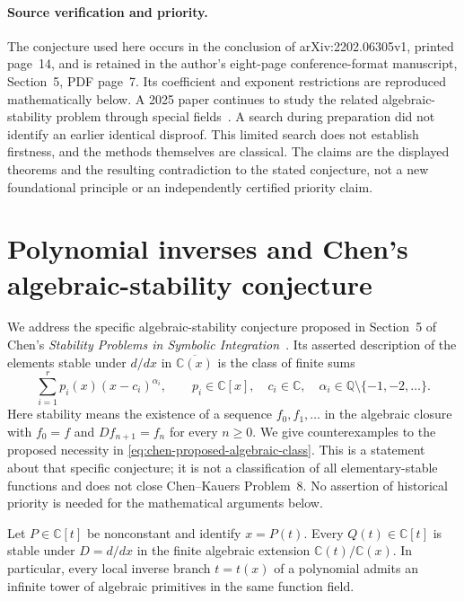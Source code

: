 \paragraph{Source verification and priority.}
The conjecture used here occurs in the conclusion of arXiv:2202.06305v1,
printed page~14, and is retained in the author's eight-page
conference-format manuscript, Section~5, PDF page~7. Its coefficient
and exponent restrictions are reproduced mathematically below.
A 2025 paper continues to study the related algebraic-stability problem
through special fields~\cite[Proposition~5.3]{SSS2025}. A search during
preparation did not identify an earlier identical disproof. This limited
search does not establish firstness, and the methods themselves are
classical. The claims are the displayed theorems and the resulting
contradiction to the stated conjecture, not a new foundational principle
or an independently certified priority claim.
\section{Polynomial inverses and Chen's algebraic-stability conjecture}
\label{sec:polynomial-inverses}

We address the specific algebraic-stability conjecture proposed in Section~5
of Chen's \emph{Stability Problems in Symbolic Integration}~\cite{Chen2022}. Its asserted
description of the elements stable under $d/dx$ in
$\overline{\mathbb C(x)}$ is the class of finite sums
\begin{equation}\label{eq:chen-proposed-algebraic-class}
 \sum_{i=1}^{r}p_i(x)(x-c_i)^{\alpha_i},\qquad
 p_i\in\mathbb C[x],\quad c_i\in\mathbb C,\quad
 \alpha_i\in\mathbb Q\setminus\{-1,-2,\ldots\}.
\end{equation}
Here stability means the existence of a sequence $f_0,f_1,\ldots$ in the
algebraic closure with $f_0=f$ and $Df_{n+1}=f_n$ for every $n\ge0$.
We give counterexamples to the proposed necessity in
\eqref{eq:chen-proposed-algebraic-class}. This is a statement about that
specific conjecture; it is not a classification of all elementary-stable
functions and does not close Chen--Kauers Problem~8. No assertion of historical
priority is needed for the mathematical arguments below.

\begin{proposition}
\label{prop:polynomial-pullback}
Let $P\in\mathbb C[t]$ be nonconstant and identify $x=P(t)$. Every
$Q(t)\in\mathbb C[t]$ is stable under $D=d/dx$ in the finite algebraic
extension $\mathbb C(t)/\mathbb C(x)$. In particular, every local inverse
branch $t=t(x)$ of a polynomial admits an infinite tower of algebraic
primitives in the same function field.
\end{proposition}

